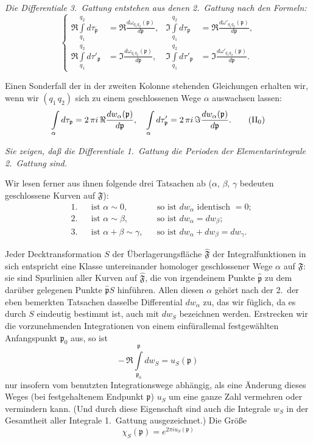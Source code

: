 \documentclass{article}
\begin{document}
\emph{Die Differentiale 3.\ Gattung entstehen aus denen 2.\ Gattung nach den Formeln:}
\[ \left\{ \begin{aligned}
\Re \int\limits_{q_1}^{q_2} d\tau_\mathfrak{p} &= \Re \frac{d\omega_{q_1 q_2}(\mathfrak{p})}{d\mathfrak{p}}, & \Im \int\limits_{q_1}^{q_2} d\tau_\mathfrak{p} &= \Re \frac{d\omega'_{q_1 q_2}(\mathfrak{p})}{d\mathfrak{p}}, \\
\Re \int\limits_{q_1}^{q_2} d\tau'_\mathfrak{p} &= \Im \frac{d\omega_{q_1 q_2}(\mathfrak{p})}{d\mathfrak{p}}, & \Im \int\limits_{q_1}^{q_2} d\tau'_\mathfrak{p} &= \Im \frac{d\omega'_{q_1 q_2}(\mathfrak{p})}{d\mathfrak{p}}.
\end{aligned} \right. \tag{II} \]

Einen Sonderfall der in der zweiten Kolonne stehenden Gleichungen erhalten wir, wenn wir $(q_1\,q_2)$ sich zu einem geschlossenen Wege $\alpha$ auswachsen lassen:
\[ \int\limits_\alpha d\tau_\mathfrak{p} = 2\,\pi i\,\Re \frac{dw_\alpha(\mathfrak{p})}{d\mathfrak{p}}, \quad \int\limits_\alpha d\tau'_\mathfrak{p} = 2\,\pi i\,\Im \frac{dw_\alpha(\mathfrak{p})}{d\mathfrak{p}}. \tag{$\mathrm{II}_0$} \]

\emph{Sie zeigen, daß die Differentiale 1.\ Gattung die Perioden der Elementarintegrale 2.\ Gattung sind.}

Wir lesen ferner aus ihnen folgende drei Tatsachen ab ($\alpha$, $\beta$, $\gamma$ bedeuten geschlossene Kurven auf $\mathfrak{F}$):
\[ \begin{aligned}
&1. & &\text{ist } \alpha \sim 0, & &\text{so ist } dw_\alpha \text{ identisch } = 0; \\
&2. & &\text{ist } \alpha \sim \beta, & &\text{so ist } dw_\alpha = dw_\beta; \\
&3. & &\text{ist } \alpha + \beta \sim \gamma, & &\text{so ist } dw_\alpha + dw_\beta = dw_\gamma.
\end{aligned} \]

Jeder Decktransformation $S$ der Überlagerungsfläche $\hat{\mathfrak{F}}$ der Integralfunktionen in sich entspricht eine Klasse untereinander homologer geschlossener Wege $\alpha$ auf $\mathfrak{F}$: sie sind Spurlinien aller Kurven auf $\hat{\mathfrak{F}}$, die von irgendeinem Punkte $\hat{\mathfrak{p}}$ zu dem darüber gelegenen Punkte $\hat{\mathfrak{p}}S$ hinführen. Allen diesen $\alpha$ gehört nach der 2.\ der eben bemerkten Tatsachen dasselbe Differential $dw_\alpha$ zu, das wir füglich, da es durch $S$ eindeutig bestimmt ist, auch mit $dw_S$ bezeichnen werden. Erstrecken wir die vorzunehmenden Integrationen von einem einfürallemal festgewählten Anfangspunkt $\mathfrak{p}_0$ aus, so ist
\[ -\,\Re \int\limits_{\mathfrak{p}_0}^\mathfrak{p} dw_S = u_S(\mathfrak{p}) \]
nur insofern vom benutzten Integrationswege abhängig, als eine Änderung dieses Weges (bei festgehaltenem Endpunkt $\mathfrak{p}$) $u_S$ um eine ganze Zahl vermehren oder vermindern kann. (Und durch diese Eigenschaft sind auch die Integrale $w_S$ in der Gesamtheit aller Integrale 1.\ Gattung ausgezeichnet.) Die Größe
\[ \chi_S(\mathfrak{p}) = e^{2\pi i u_S(\mathfrak{p})} \]
\end{document}
